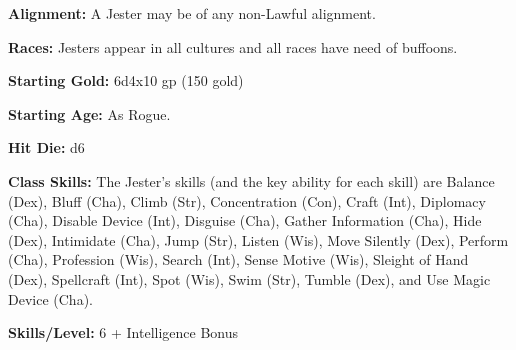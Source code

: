 \documentclass[10pt]{article}
\newcommand{\ability}[2]{\smallskip \noindent \textbf{#1} #2}
\begin{document}
\ability{Alignment:}{A Jester may be of any non-Lawful alignment.}

\ability{Races:}{Jesters appear in all cultures and all races have need of buffoons.}

\ability{Starting Gold:}{6d4x10 gp (150 gold)}

\ability{Starting Age:}{As Rogue.}

\ability{Hit Die:}{d6}

\ability{Class Skills:}{The Jester's skills (and the key ability for each skill) are Balance (Dex), Bluff (Cha), Climb (Str), Concentration (Con), Craft (Int), Diplomacy (Cha), Disable Device (Int), Disguise (Cha), Gather Information (Cha), Hide (Dex), Intimidate (Cha), Jump (Str), Listen (Wis), Move Silently (Dex), Perform (Cha), Profession (Wis), Search (Int), Sense Motive (Wis), Sleight of Hand (Dex), Spellcraft (Int), Spot (Wis), Swim (Str), Tumble (Dex), and Use Magic Device (Cha).}

\ability{Skills/Level:}{6 + Intelligence Bonus}
\end{document}
